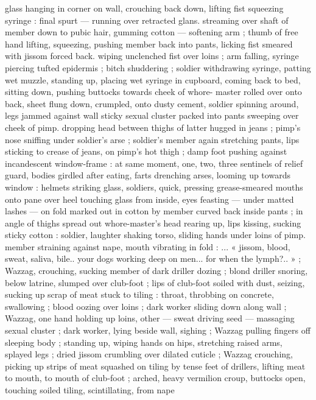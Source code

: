 glass hanging in corner on wall, crouching back down, lifting fist
squeezing syringe : final spurt --- running over retracted glans.
streaming over shaft of member down to pubic hair, gumming cotton
--- softening arm ; thumb of free hand lifting, squeezing, pushing
member back into pants, licking fist smeared with jissom forced back.
wiping unclenched fist over loins ; arm falling, syringe piercing tufted
epidermis ; bitch shuddering ; soldier withdrawing syringe, patting
wet muzzle, standing up, placing wet syringe in cupboard, coming
back to bed, sitting down, pushing buttocks towards cheek of whore-
master rolled over onto back, sheet flung down, crumpled, onto
dusty cement, soldier spinning around, legs jammed against wall
sticky sexual cluster packed into pants sweeping over cheek of pimp.
dropping head between thighs of latter hugged in jeans ; pimp’s
nose sniffing under soldier's arse ; soldier's member again
stretching pants, lips sticking to crease of jeans, on pimp's hot thigh
; damp foot pushing against incandescent window-frame : at same
moment, one, two, three sentinels of relief guard, bodies girdled
after eating, farts drenching arses, looming up towards window :
helmets striking glass, soldiers, quick, pressing grease-smeared
mouths onto pane over heel touching glass from inside, eyes
feasting --- under matted lashes --- on fold marked out in cotton by
member curved back inside pants ; in angle of thighs spread out
whore-master’s head rearing up, lips kissing, sucking sticky cotton :
soldier, laughter shaking torso, sliding hands under loins of pimp.
member straining against nape, mouth vibrating in fold : ... « jissom,
blood, sweat, saliva, bile.. your dogs working deep on men... for
when the lymph?.. » ; Wazzag, crouching, sucking member of dark
driller dozing ; blond driller snoring, below latrine, slumped over
club-foot ; lips of club-foot soiled with dust, seizing, sucking up
scrap of meat stuck to tiling : throat, throbbing on concrete,
swallowing ; blood oozing over loins ; dark worker sliding down along
wall ; Wazzag, one hand holding up loins, other --- sweat driving
seed --- massaging sexual cluster ; dark worker, lying beside wall,
sighing ; Wazzag pulling fingers off sleeping body ; standing up,
wiping hands on hips, stretching raised arms, splayed legs ; dried
jissom crumbling over dilated cuticle ; Wazzag crouching, picking up
strips of meat squashed on tiling by tense feet of drillers, lifting
meat to mouth, to mouth of club-foot ; arched, heavy vermilion
croup, buttocks open, touching soiled tiling, scintillating, from nape
